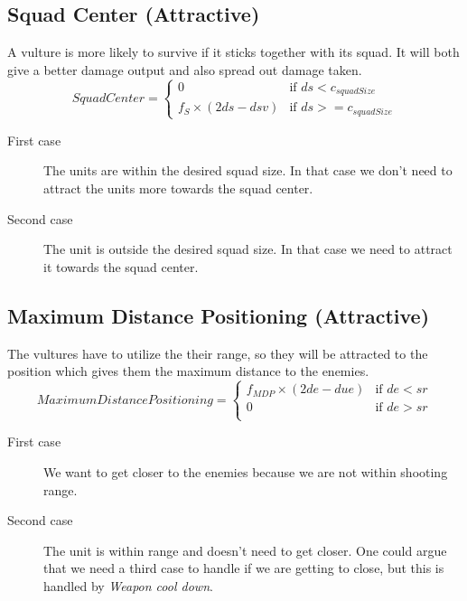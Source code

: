 	\subsection{Squad Center (Attractive)}
		\label{SCA_label}A vulture is more likely to survive if it sticks together with its squad. 
		It will both give a better damage output and also spread out damage taken.
		\begin{displaymath}
			SquadCenter  = \begin{cases}
					0 & \text{if } ds < c_{squadSize} \\
					f_{S} \times (2ds - dsv) & \text{if } ds >= c_{squadSize}
				\end{cases}		
		\end{displaymath}
		
		\begin{description}
			\item[First case] The units are within the desired squad size. In that case we don't need to attract the units more towards the squad center.
			\item[Second case] The unit is outside the desired squad size. In that case we need to attract it towards the squad center.
		\end{description}
	\subsection{Maximum Distance Positioning (Attractive)}
		The vultures have to utilize the their range, so they will be attracted to the position which gives them the maximum distance to the enemies.
		\begin{displaymath}
			MaximumDistancePositioning = \begin{cases}
					f_{MDP} \times (2de - due) & \text{if } de < sr\\
					0 & \text{if } de > sr\\
				\end{cases}		
		\end{displaymath}
		\begin{description}
			\item[First case] We want to get closer to the enemies because we are not within shooting range.
			\item[Second case] The unit is within range and doesn't need to get closer. One could argue that we need a third case to handle if we are getting to close, but this is handled by \textit{Weapon cool down}.
		\end{description}
		\pagebreak
